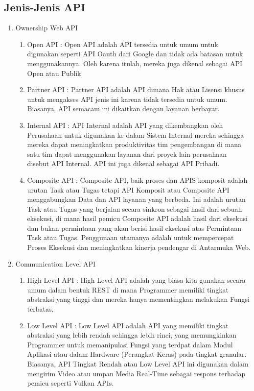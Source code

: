 \subsection{Jenis-Jenis API}
\begin{enumerate}
	\item Ownership Web API
	\begin{enumerate}
		\item Open API : Open API adalah API tersedia untuk umum untuk digunakan seperti API Oauth dari Google dan tidak ada batasan untuk menggunakannya. Oleh karena itulah, mereka juga dikenal sebagai API Open atau Publik
		\item Partner API : Partner API adalah API dimana Hak atau Lisensi khusus untuk mengakses API jenis ini karena tidak tersedia untuk umum. Biasanya, API semacam ini dikaitkan dengan layanan berbayar.
		\item Internal API : API Internal adalah API yang dikembangkan oleh Perusahaan untuk digunakan ke dalam Sistem Internal mereka sehingga mereka dapat meningkatkan produktivitas tim pengembangan di mana satu tim dapat menggunakan layanan dari proyek lain perusahaan disebut API Internal. API ini juga dikenal sebagai API Pribadi.
		\item Composite API : Composite API, baik proses dan APIS komposit adalah urutan Task atau Tugas tetapi API Komposit atau Composite API menggabungkan Data dan API layanan yang berbeda. Ini adalah urutan Task atau Tugas yang berjalan secara sinkron sebagai hasil dari sebuah eksekusi, di mana hasil pemicu Composite API adalah hasil dari eksekusi dan bukan permintaan yang akan berisi hasil eksekusi atas Permintaan Task atau Tugas. Penggunaan utamanya adalah untuk mempercepat Proses Eksekusi dan meningkatkan kinerja pendengar di Antarmuka Web.
	\end{enumerate}
	\item Communication Level API
	\begin{enumerate}
		\item High Level API : High Level API adalah yang biasa kita gunakan secara umum dalam bentuk REST di mana Programmer memiliki tingkat abstraksi yang tinggi dan mereka hanya mementingkan melakukan Fungsi terbatas.
		\item Low Level API : Low Level API adalah API yang memiliki tingkat abstraksi yang lebih rendah sehingga lebih rinci, yang memungkinkan Programmer untuk memanipulasi Fungsi yang terdpat dalam Modul Aplikasi atau dalam Hardware (Perangkat Keras) pada tingkat granular. Biasanya, API Tingkat Rendah atau Low Level API ini digunakan dalam mengirim Video atau umpan Media Real-Time sebagai respons terhadap pemicu seperti Vulkan APIs.

\end{enumerate}
\end{enumerate}
